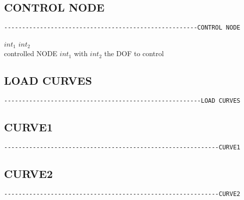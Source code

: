 \subsection{CONTROL NODE}
\begin{verbatim}
------------------------------------------------------CONTROL NODE
\end{verbatim}

 $int_1$  $int_2$\\
controlled NODE $int_1$ with $int_2$ the DOF to control

\subsection{LOAD CURVES}
\begin{verbatim}
-------------------------------------------------------LOAD CURVES
\end{verbatim}


\subsection{CURVE1}
\begin{verbatim}
------------------------------------------------------------CURVE1
\end{verbatim}


\subsection{CURVE2}
\begin{verbatim}
------------------------------------------------------------CURVE2
\end{verbatim}


